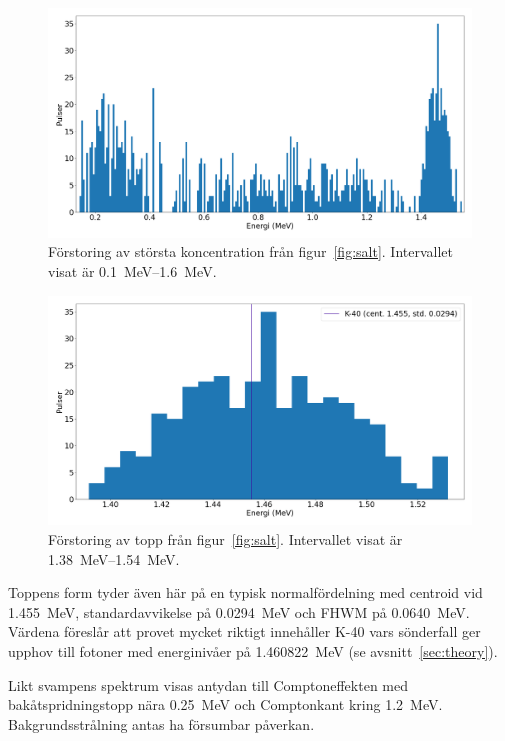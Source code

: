 \begin{figure}[htp]
    \centering
    \includegraphics[width=\textwidth, keepaspectratio]{../images/salt_zoom.png}
    \caption{
        Förstoring av största koncentration från figur~\ref{fig:salt}.
        Intervallet visat är \qtyrange{0.1}{1.6}{\MeV}.
    }
    \label{fig:saltzoom}
\end{figure}

\begin{figure}[htp]
    \centering
    \includegraphics[width=\textwidth, keepaspectratio]{../images/salt_top.png}
    \caption{
        Förstoring av topp från figur~\ref{fig:salt}.
        Intervallet visat är \qtyrange{1.38}{1.54}{\MeV}.
    }
    \label{fig:salttop}
\end{figure}

Toppens form tyder även här på en typisk normalfördelning med centroid vid
\qty{1.455}{\MeV}, standardavvikelse på \qty{0.0294}{\MeV} och FHWM på
\qty{0.0640}{\MeV}. Värdena föreslår att provet mycket riktigt innehåller K-40
vars sönderfall ger upphov till fotoner med energinivåer på
\qty{1.460822}{\MeV} (se avsnitt~\ref{sec:theory}).

Likt svampens spektrum visas antydan till Comptoneffekten med
bakåtspridningstopp nära \qty{0.25}{\MeV} och Comptonkant kring
\qty{1.2}{\MeV}. Bakgrundsstrålning antas ha försumbar påverkan.

